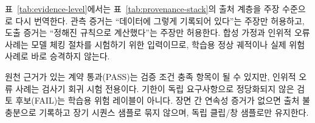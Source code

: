 표~\ref{tab:evidence-level}에서는 표~\ref{tab:provenance-stack}의 출처 계층을 주장 수준으로 다시 번역한다. 관측 증거는 ``데이터에 그렇게 기록되어 있다''는 주장만 허용하고, 도출 증거는 ``정해진 규칙으로 계산했다''는 주장만 허용한다. 합성 가정과 인위적 오류 사례는 모델 체킹 절차를 시험하기 위한 입력이므로, 학습용 정상 궤적이나 실제 위험 사례로 바로 승격하지 않는다.

원천 근거가 있는 계약 통과(PASS)는 검증 조건 충족 항목이 될 수 있지만, 인위적 오류 사례는 검사기 회귀 시험 전용이다. 기한이 독립 요구사항으로 정당화되지 않은 검토 후보(FAIL)는 학습용 위험 레이블이 아니다. 장면 간 연속성 증거가 없으면 출처 불충분으로 기록하고 장기 시퀀스 샘플로 묶지 않으며, 독립 클립/창 샘플로만 유지한다.
